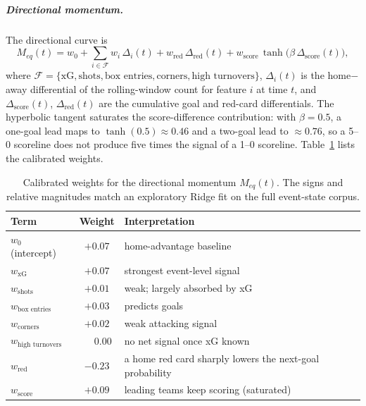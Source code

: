\documentclass[pdflatex,sn-mathphys-num]{sn-jnl}
\theoremstyle{thmstyleone}
\theoremstyle{thmstyletwo}
\theoremstyle{thmstylethree}
\begin{document}
\subparagraph{Directional momentum.}
The directional curve is
\begin{equation}
M_{eq}(t) = w_0 + \sum_{i \in \mathcal{F}} w_i\,\Delta_i(t)
          + w_{\text{red}}\,\Delta_{\text{red}}(t)
          + w_{\text{score}}\,\tanh\!\bigl(\beta\,\Delta_{\text{score}}(t)\bigr),
\label{eq:momentum_eq}
\end{equation}
where $\mathcal{F} = \{\text{xG}, \text{shots}, \text{box entries},
\text{corners}, \text{high turnovers}\}$, $\Delta_i(t)$ is the
home$-$away differential of the rolling-window count for feature $i$ at
time $t$, and $\Delta_{\text{score}}(t)$, $\Delta_{\text{red}}(t)$ are
the cumulative goal and red-card differentials. The hyperbolic tangent
saturates the score-difference contribution: with $\beta = 0.5$, a
one-goal lead maps to $\tanh(0.5)\approx 0.46$ and a two-goal lead to
$\approx 0.76$, so a 5--0 scoreline does not produce five times the
signal of a 1--0 scoreline. Table~\ref{tab:eq_weights} lists the
calibrated weights.

\begin{table}[htbp]
\centering
\caption{Calibrated weights for the directional momentum $M_{eq}(t)$.
The signs and relative magnitudes match an exploratory Ridge fit on the
full event-state corpus.}
\label{tab:eq_weights}
\begin{tabular}{@{}lcl@{}}
\toprule
\textbf{Term} & \textbf{Weight} & \textbf{Interpretation} \\
\midrule
$w_0$ (intercept)               & $+0.07$           & home-advantage baseline \\
$w_{\text{xG}}$                 & $+0.07$           & strongest event-level signal \\
$w_{\text{shots}}$              & $+0.01$           & weak; largely absorbed by xG \\
$w_{\text{box entries}}$        & $+0.03$           & predicts goals \\
$w_{\text{corners}}$            & $+0.02$           & weak attacking signal \\
$w_{\text{high turnovers}}$     & $\phantom{+}0.00$ & no net signal once xG known \\
$w_{\text{red}}$                & $-0.23$           & a home red card sharply lowers
                                                       the next-goal probability \\
$w_{\text{score}}$              & $+0.09$           & leading teams keep scoring (saturated) \\
\bottomrule
\end{tabular}
\end{table}
\end{document}
